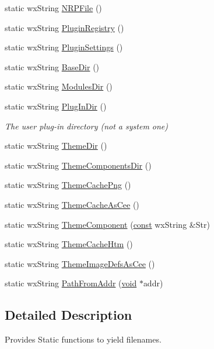 \begin{DoxyCompactItemize}
\item 
static wx\+String \hyperlink{class_file_names_a7453d42e2cb2771d25d195fd9b69079d}{N\+R\+P\+File} ()
\item 
static wx\+String \hyperlink{class_file_names_a6a0e344d4f73c63bc59319478fcd3586}{Plugin\+Registry} ()
\item 
static wx\+String \hyperlink{class_file_names_a09d120f72f802c2dc0741c097142f8a9}{Plugin\+Settings} ()
\item 
static wx\+String \hyperlink{class_file_names_a8d4a2d49dc2aa977aa570e4695a54665}{Base\+Dir} ()
\item 
static wx\+String \hyperlink{class_file_names_a76ba26d7716a46b2477d2b230cff6472}{Modules\+Dir} ()
\item 
static wx\+String \hyperlink{class_file_names_ae4f8da7e84e7fe2f8c7852915ef491a3}{Plug\+In\+Dir} ()
\begin{DoxyCompactList}\small\item\em The user plug-\/in directory (not a system one) \end{DoxyCompactList}\item 
static wx\+String \hyperlink{class_file_names_a72b9b7cdb8d79c9d78090d678233fcc7}{Theme\+Dir} ()
\item 
static wx\+String \hyperlink{class_file_names_a69e03d833c291ecabce85b3e4f13e8d9}{Theme\+Components\+Dir} ()
\item 
static wx\+String \hyperlink{class_file_names_ac07456247357fe63b5c1972a477cde98}{Theme\+Cache\+Png} ()
\item 
static wx\+String \hyperlink{class_file_names_a0c56266c056e70672b4a152180b3bdf2}{Theme\+Cache\+As\+Cee} ()
\item 
static wx\+String \hyperlink{class_file_names_a218e9ff0228b300cf8f769eef5e6c015}{Theme\+Component} (\hyperlink{getopt1_8c_a2c212835823e3c54a8ab6d95c652660e}{const} wx\+String \&Str)
\item 
static wx\+String \hyperlink{class_file_names_a333588a81c350e9ae00565bc18cfc703}{Theme\+Cache\+Htm} ()
\item 
static wx\+String \hyperlink{class_file_names_abbecad52f21d781750e51f1514d329d2}{Theme\+Image\+Defs\+As\+Cee} ()
\item 
static wx\+String \hyperlink{class_file_names_a19e2e6c0703784221df5a8afc36c93ba}{Path\+From\+Addr} (\hyperlink{sound_8c_ae35f5844602719cf66324f4de2a658b3}{void} $\ast$addr)
\end{DoxyCompactItemize}


\subsection{Detailed Description}
Provides Static functions to yield filenames. 

